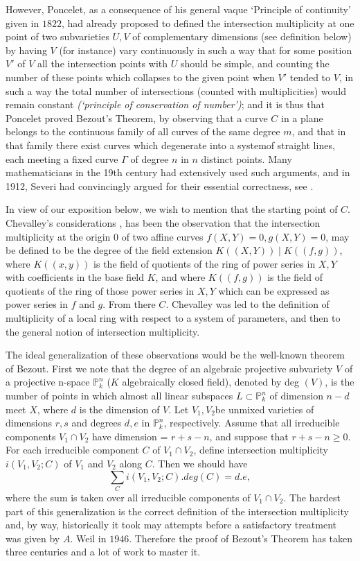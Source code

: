 However, Poncelet, as a consequence of his general vaque `Principle of
continuity' given in $1822$, had already proposed to defined the
intersection multiplicity at one point of two subvarieties $U,V$ of
complementary dimensions (see definition below) by having $V$ (for
instance) vary continuously in such a way that for some position $V'$
of $V$ all the intersection points with $U$ should be simple, and
counting the number of these points which collapses to the given point
when $V'$ tended to $V$, in such a way the total number of
intersections (counted with multiplicities) would remain constant
\textit {(`principle of conservation of number')}; and it is thus that
Poncelet proved Bezout's Theorem, by observing that a curve $C$ in a
plane belongs to the continuous family of all curves of the same
degree $m$, and that in that family there exist curves which
degenerate into a system\pageoriginale of straight lines, each meeting a fixed curve
$\Gamma$ of degree $n$ in $n$ distinct points. Many mathematicians in
the 19th century had extensively used such arguments, and in 1912,
Severi had convincingly argued for their essential correctness, see
\cite{73}. 

In view of our exposition below, we wish to mention that the starting
point of $C$. Chevalley's considerations \cite{11}, \cite{12} has been the
observation that the intersection multiplicity at the origin 0 of
two affine curves $f(X,Y) = 0, g(X,Y) = 0$, may be defined to be the
degree of the field extension $K ((X,Y)) \mid K ((f,g))$, where
$K((x,y))$ is the field of quotients of the ring of power series in
$X,Y$ with coefficients in the base field $K$, and where $K((f,g))$ is
the field of quotients of the ring of those power series in $X,Y$
which can be expressed as power series in $f$ and $g$. From there
$C$. Chevalley was led to the definition of multiplicity of a local
ring with respect to a system of parameters, and then to the general
notion of intersection multiplicity. 

The ideal generalization of these observations would be the well-known
theorem of Bezout. First we note that the degree of an algebraic
projective subvariety $V$ of a projective n-space $\mathbb{P}^n_k$
($K$ algebraically closed field), denoted by deg $(V)$, is the number
of points in which almost all linear subspaces $L \subset
\mathbb{P}^n_k$ of dimension $n - d $ meet $X$, where $d$ is the
dimension of $V$. Let $V_1, V_2$\pageoriginale be unmixed varieties of dimensions
$r,s$ and degrees $d,e$ in $\mathbb{P}^n_k$, respectively. Assume
that all irreducible components $V_1 \cap V_2$ have dimension = $r + s
- n$, and suppose that $r + s - n\ge 0$. For each irreducible component
$C$ of $V_1 \cap V_2$, define intersection multiplicity $i (V_1, V_2 ;
C)$ of $V_1$ and $V_2$ along $C$. Then we should have  
$$
\sum_C i (V_1, V_2 ; C).deg (C) = d.e,
$$
where the sum is taken over all irreducible components of $V_1 \cap
V_2$. The hardest part of this generalization is the correct
definition of the intersection multiplicity and, by way, historically it
took may attempts before a satisfactory treatment was given by
$A$. Weil \cite{103} in $1946$. Therefore the proof of Bezout's Theorem
has taken three centuries and a lot of work to master it. 

